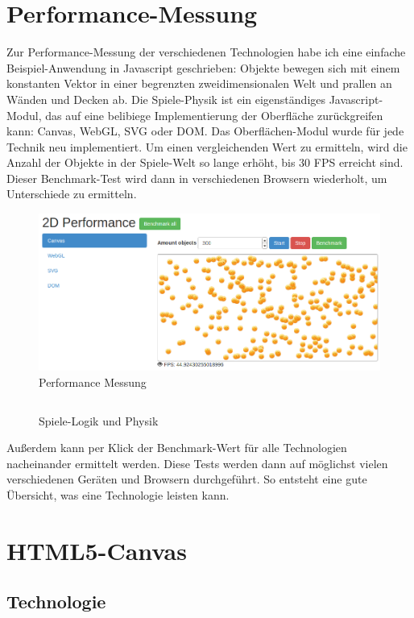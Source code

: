 \documentclass[a4paper, 12pt]{article}
\begin{document}
\section{Performance-Messung}
Zur Performance-Messung der verschiedenen Technologien habe ich eine einfache Beispiel-Anwendung in Javascript geschrieben: Objekte bewegen sich mit einem konstanten Vektor in einer begrenzten zweidimensionalen Welt und prallen an Wänden und Decken ab. Die Spiele-Physik ist ein eigenständiges Javascript-Modul, das auf eine belibiege Implementierung der Oberfläche zurückgreifen kann: Canvas, WebGL, SVG oder DOM. Das Oberflächen-Modul wurde für jede Technik neu implementiert. Um einen vergleichenden Wert zu ermitteln, wird die Anzahl der Objekte in der Spiele-Welt so lange erhöht, bis 30 FPS erreicht sind. Dieser Benchmark-Test wird dann in verschiedenen Browsern wiederholt, um Unterschiede zu ermitteln.
\begin{figure}[h!]
	\begin{center}
		\includegraphics[width=\textwidth]{assets/demo_screenshot.png} 
	\end{center}
	\caption{Performance Messung}
	\label{performance_benchmark}
\end{figure}
\begin{figure}[h!]
	\inputminted{javascript}{assets/benchmark1.js}
	\caption{Spiele-Logik und Physik}
	\label{benchmark1}
	\newpage
\end{figure}
Außerdem kann per Klick der Benchmark-Wert für alle Technologien nacheinander ermittelt werden. Diese Tests werden dann auf möglichst vielen verschiedenen Geräten und Browsern durchgeführt. So entsteht eine gute Übersicht, was eine Technologie leisten kann.
\newpage
\section{HTML5-Canvas}
\subsection{Technologie}
\end{document}
